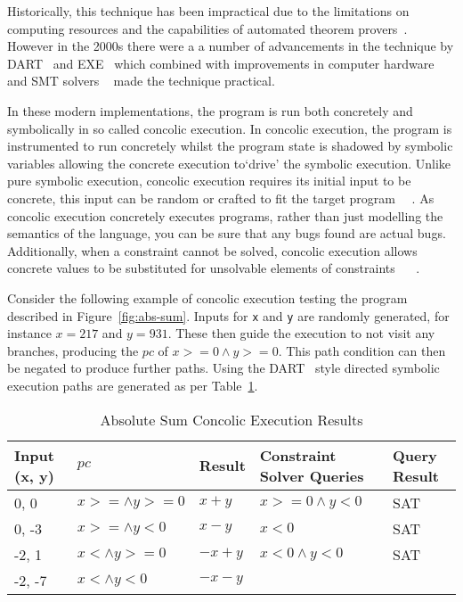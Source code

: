 \documentclass[]{final_report}
\begin{document}
Historically, this technique has been impractical due to the limitations on computing resources and the capabilities of automated theorem provers~\cite{king1976symbolic}. However in the 2000s there were a a number of advancements in the technique by DART~\cite{godefroid2005dart} and EXE~\cite{cadar2008exe} which combined with improvements in computer hardware and SMT solvers ~\cite{de2011satisfiability} made the technique practical.

In these modern implementations, the program is run both concretely and symbolically in so called concolic execution. In concolic execution, the program is instrumented to run concretely whilst the program state is shadowed by symbolic variables allowing the concrete execution to`drive' the symbolic execution. Unlike pure symbolic execution, concolic execution requires its initial input to be concrete, this input can be random or crafted to fit the target program~\cite{godefroid2008grammar} ~\cite{cadar2013symbolic}. As concolic execution concretely executes programs, rather than just modelling the semantics of the language, you can be sure that any bugs found are actual bugs. Additionally, when a constraint cannot be solved, concolic execution allows concrete values to be substituted for unsolvable elements of constraints ~\cite{sen2007concolic} ~\cite{sen2005cute}.

Consider the following example of concolic execution testing the program described in  Figure~\ref{fig:abs-sum}. Inputs for \lstinline{x} and \lstinline{y} are randomly generated, for instance $x=217$ and $y=931$. These then guide the execution to not visit any branches, producing the $pc$ of $x >= 0 \land y >=0$. This path condition can then be negated to produce further paths. Using the DART~\cite{godefroid2005dart} style directed symbolic execution paths are generated as per Table~\ref{abs-sum-ce-table}.

\begin{table}[]
\centering
\begin{tabular}{|l|l|l|l|l|}
\hline
Input (x, y) & $pc$ & Result & Constraint Solver Queries & Query Result \\ \hline
0, 0 & $x >= \land y >= 0$ & $x+y$ & $x >=0 \land y < 0 $ & SAT \\ \hline
0, -3 & $x >= \land y < 0$ & $x - y$ & $x <0 $ & SAT \\ \hline
-2, 1 & $x < \land y >= 0$ & $-x+y$ & $x<0 \land y < 0 $ & SAT \\ \hline
-2, -7 & $x < \land y < 0$ & $-x-y$ &  &  \\ \hline
\end{tabular}
\caption{Absolute Sum Concolic Execution Results}
\label{abs-sum-ce-table}
\end{table}
\end{document}
